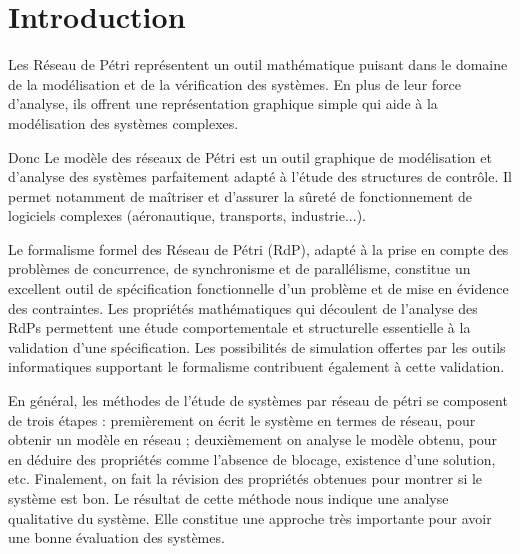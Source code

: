  	 \section*{Introduction}
 	  
    Les Réseau de Pétri représentent un outil mathématique puisant dans le domaine de la modélisation et de la vérification des systèmes. En plus de leur force d’analyse, ils offrent une représentation graphique simple qui aide à la modélisation des systèmes complexes. 
    
    Donc Le modèle des réseaux de Pétri est un outil graphique de modélisation et d'analyse des systèmes parfaitement adapté à l'étude des structures de contrôle. Il permet notamment de maîtriser et d'assurer la sûreté de fonctionnement de logiciels complexes (aéronautique, transports, industrie...). 
    
    Le formalisme formel des Réseau de Pétri (RdP), adapté à la prise en compte des problèmes de concurrence, de synchronisme et de parallélisme, constitue un excellent outil de spécification fonctionnelle d'un problème et de mise en évidence des contraintes. Les propriétés mathématiques qui découlent de l'analyse des RdPs permettent une étude comportementale et structurelle essentielle à la validation d'une spécification. Les possibilités de simulation offertes par les outils informatiques supportant le formalisme contribuent également à cette validation. 
    
    En général, les méthodes de l'étude de systèmes par réseau de pétri se composent de trois étapes : premièrement on écrit le système en termes de réseau, pour obtenir un modèle en réseau ; deuxièmement on analyse le modèle obtenu, pour en déduire des propriétés comme l’absence de blocage, existence d'une solution, etc. Finalement, on fait la révision des propriétés obtenues pour montrer si le système est bon. Le résultat de cette méthode nous indique une analyse qualitative du système. Elle constitue une approche très importante pour avoir une bonne évaluation des systèmes.
    
